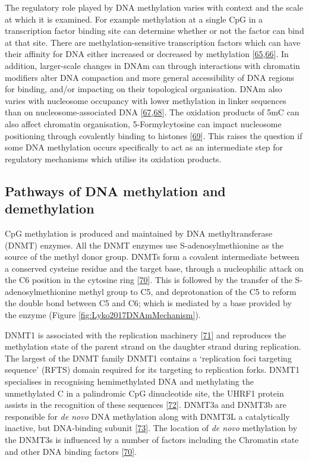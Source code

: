 \documentclass[
]{book}
\begin{document}
The regulatory role played by DNA methylation varies with context and the scale at which it is examined.
For example methylation at a single CpG in a transcription factor binding site can determine whether or not the factor can bind at that site.
There are methylation-sensitive transcription factors which can have their affinity for DNA either increased or decreased by methylation {[}\protect\hyperlink{ref-Yin2017}{65},\protect\hyperlink{ref-Zuo2017}{66}{]}.
In addition, larger-scale changes in DNAm can through interactions with chromatin modifiers alter DNA compaction and more general accessibility of DNA regions for binding, and/or impacting on their topological organisation.
DNAm also varies with nucleosome occupancy with lower methylation in linker sequences than on nucleosome-associated DNA {[}\protect\hyperlink{ref-Kelly2012}{67},\protect\hyperlink{ref-Huff2014}{68}{]}.
The oxidation products of 5mC can also affect chromatin organisation, 5-Formylcytosine can impact nucleosome positioning through covalently binding to histones {[}\protect\hyperlink{ref-Raiber2017}{69}{]}.
This raises the question if some DNA methylation occurs specifically to act as an intermediate step for regulatory mechanisms which utilise its oxidation products.

\hypertarget{pathways-of-dna-methylation-and-demethylation}{%
\subsection{Pathways of DNA methylation and demethylation}\label{pathways-of-dna-methylation-and-demethylation}}

CpG methylation is produced and maintained by DNA methyltransferase (DNMT) enzymes.
All the DNMT enzymes use S-adenosylmethionine as the source of the methyl donor group.
DNMTs form a covalent intermediate between a conserved cysteine residue and the target base, through a nucleophilic attack on the C6 position in the cytosine ring {[}\protect\hyperlink{ref-Lyko2017}{70}{]}.
This is followed by the transfer of the S-adenosylmethionine methyl group to C5, and deprotonation of the C5 to reform the double bond between C5 and C6; which is mediated by a base provided by the enzyme (Figure \ref{fig:Lyko2017DNAmMechanism}).

DNMT1 is associated with the replication machinery {[}\protect\hyperlink{ref-Vertino2002}{71}{]} and reproduces the methylation state of the parent strand on the daughter strand during replication.
The largest of the DNMT family DNMT1 contains a `replication foci targeting sequence' (RFTS) domain required for its targeting to replication forks.
DNMT1 specialises in recognising hemimethylated DNA and methylating the unmethylated C in a palindromic CpG dinucleotide site, the UHRF1 protein assists in the recognition of these sequences {[}\protect\hyperlink{ref-Bostick2007}{72}{]}.
DNMT3a and DNMT3b are responsible for \emph{de novo} DNA methylation along with DNMT3L a catalytically inactive, but DNA-binding subunit {[}\protect\hyperlink{ref-Jia2009}{73}{]}.
The location of \emph{de novo} methylation by the DNMT3s is influenced by a number of factors including the Chromatin state and other DNA binding factors {[}\protect\hyperlink{ref-Lyko2017}{70}{]}.
\end{document}

